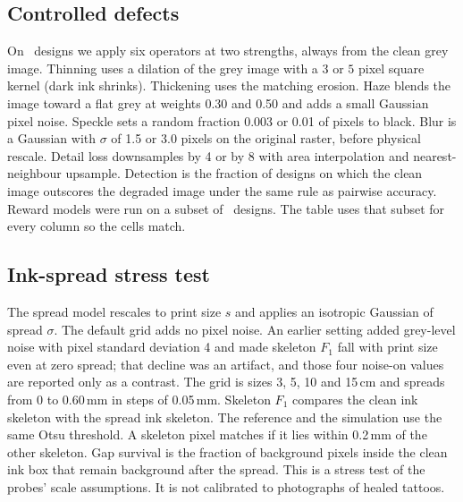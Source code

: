 \subsection{Controlled defects}
On \nDegrDesigns\ designs we apply six operators at two strengths, always from the clean grey image.
Thinning uses a dilation of the grey image with a $3$ or $5$ pixel square kernel (dark ink shrinks).
Thickening uses the matching erosion.
Haze blends the image toward a flat grey at weights 0.30 and 0.50 and adds a small Gaussian pixel noise.
Speckle sets a random fraction 0.003 or 0.01 of pixels to black.
Blur is a Gaussian with $\sigma$ of 1.5 or 3.0 pixels on the original raster, before physical rescale.
Detail loss downsamples by 4 or by 8 with area interpolation and nearest-neighbour upsample.
Detection is the fraction of designs on which the clean image outscores the degraded image under the same rule as pairwise accuracy.
Reward models were run on a subset of \nDegrRewDesigns\ designs.
The table uses that subset for every column so the cells match.

\subsection{Ink-spread stress test}
The spread model rescales to print size $s$ and applies an isotropic Gaussian of spread $\sigma$.
The default grid adds no pixel noise.
An earlier setting added grey-level noise with pixel standard deviation 4 and made skeleton $F_1$ fall with print size even at zero spread; that decline was an artifact, and those four noise-on values are reported only as a contrast.
The grid is sizes 3, 5, 10 and 15\,cm and spreads from 0 to 0.60\,mm in steps of 0.05\,mm.
Skeleton $F_1$ compares the clean ink skeleton with the spread ink skeleton.
The reference and the simulation use the same Otsu threshold.
A skeleton pixel matches if it lies within 0.2\,mm of the other skeleton.
Gap survival is the fraction of background pixels inside the clean ink box that remain background after the spread.
This is a stress test of the probes' scale assumptions.
It is not calibrated to photographs of healed tattoos.
